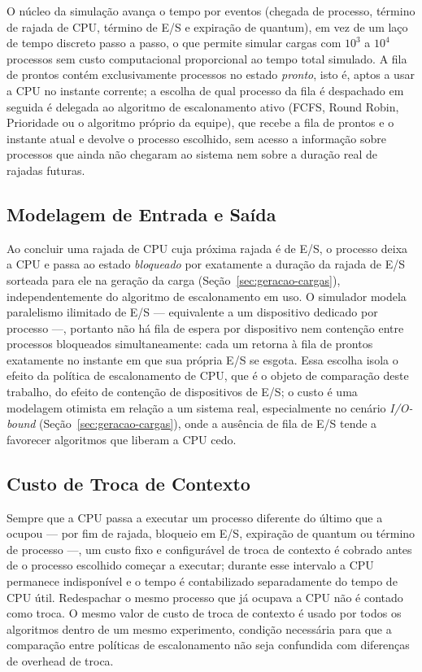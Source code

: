 \documentclass[conference]{IEEEtran}
\begin{document}
O núcleo da simulação avança o tempo por eventos (chegada de processo, término de rajada de CPU, término de E/S e expiração de quantum), em vez de um laço de tempo discreto passo a passo, o que permite simular cargas com $10^3$ a $10^4$ processos sem custo computacional proporcional ao tempo total simulado. A fila de prontos contém exclusivamente processos no estado \textit{pronto}, isto é, aptos a usar a CPU no instante corrente; a escolha de qual processo da fila é despachado em seguida é delegada ao algoritmo de escalonamento ativo (FCFS, Round Robin, Prioridade ou o algoritmo próprio da equipe), que recebe a fila de prontos e o instante atual e devolve o processo escolhido, sem acesso a informação sobre processos que ainda não chegaram ao sistema nem sobre a duração real de rajadas futuras.

\subsection{Modelagem de Entrada e Saída}

Ao concluir uma rajada de CPU cuja próxima rajada é de E/S, o processo deixa a CPU e passa ao estado \textit{bloqueado} por exatamente a duração da rajada de E/S sorteada para ele na geração da carga (Seção~\ref{sec:geracao-cargas}), independentemente do algoritmo de escalonamento em uso. O simulador modela paralelismo ilimitado de E/S — equivalente a um dispositivo dedicado por processo —, portanto não há fila de espera por dispositivo nem contenção entre processos bloqueados simultaneamente: cada um retorna à fila de prontos exatamente no instante em que sua própria E/S se esgota. Essa escolha isola o efeito da política de escalonamento de CPU, que é o objeto de comparação deste trabalho, do efeito de contenção de dispositivos de E/S; o custo é uma modelagem otimista em relação a um sistema real, especialmente no cenário \textit{I/O-bound} (Seção~\ref{sec:geracao-cargas}), onde a ausência de fila de E/S tende a favorecer algoritmos que liberam a CPU cedo.

\subsection{Custo de Troca de Contexto}

Sempre que a CPU passa a executar um processo diferente do último que a ocupou — por fim de rajada, bloqueio em E/S, expiração de quantum ou término de processo —, um custo fixo e configurável de troca de contexto é cobrado antes de o processo escolhido começar a executar; durante esse intervalo a CPU permanece indisponível e o tempo é contabilizado separadamente do tempo de CPU útil. Redespachar o mesmo processo que já ocupava a CPU não é contado como troca. O mesmo valor de custo de troca de contexto é usado por todos os algoritmos dentro de um mesmo experimento, condição necessária para que a comparação entre políticas de escalonamento não seja confundida com diferenças de overhead de troca.
\end{document}
